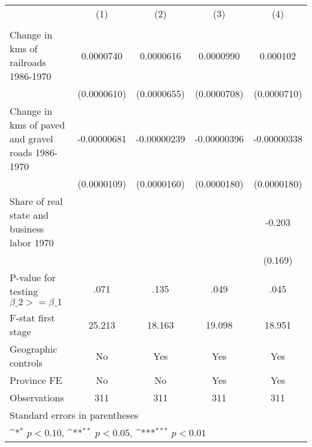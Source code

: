 {
\def\sym#1{\ifmmode^{#1}\else\(^{#1}\)\fi}
\begin{tabular}{l*{4}{c}}
\hline\hline
                &\multicolumn{1}{c}{(1)}&\multicolumn{1}{c}{(2)}&\multicolumn{1}{c}{(3)}&\multicolumn{1}{c}{(4)}\\
                &\multicolumn{1}{c}{}&\multicolumn{1}{c}{}&\multicolumn{1}{c}{}&\multicolumn{1}{c}{}\\
\hline
Change in kms of railroads 1986-1970&0.0000740         &0.0000616         &0.0000990         & 0.000102         \\
                &(0.0000610)         &(0.0000655)         &(0.0000708)         &(0.0000710)         \\
[1em]
Change in kms of paved and gravel roads 1986-1970&-0.00000681         &-0.00000239         &-0.00000396         &-0.00000338         \\
                &(0.0000109)         &(0.0000160)         &(0.0000180)         &(0.0000180)         \\
[1em]
Share of real state and business labor 1970&                  &                  &                  &   -0.203         \\
                &                  &                  &                  &  (0.169)         \\
\hline
P-value for testing $\beta\_{2} >= \beta\_{1}$&     .071         &     .135         &     .049         &     .045         \\
F-stat first stage&   25.213         &   18.163         &   19.098         &   18.951         \\
Geographic controls&       No         &      Yes         &      Yes         &      Yes         \\
Province FE     &       No         &       No         &      Yes         &      Yes         \\
Observations    &      311         &      311         &      311         &      311         \\
\hline\hline
\multicolumn{5}{l}{\footnotesize Standard errors in parentheses}\\
\multicolumn{5}{l}{\footnotesize \sym{*} \(p<0.10\), \sym{**} \(p<0.05\), \sym{***} \(p<0.01\)}\\
\end{tabular}
}
